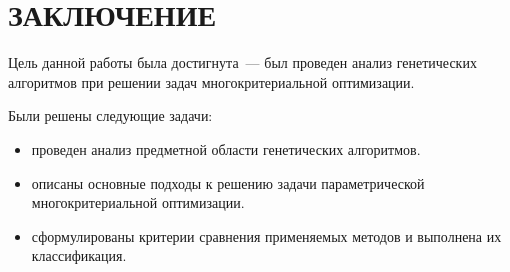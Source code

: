 \chapter*{ЗАКЛЮЧЕНИЕ}
Цель данной работы была достигнута~--- был проведен анализ генетических алгоритмов при решении задач многокритериальной оптимизации.

Были решены следующие задачи:
\begin{itemize}
    \item проведен анализ предметной области генетических алгоритмов.
    \item описаны основные подходы к решению задачи параметрической многокритериальной оптимизации.
    \item сформулированы критерии сравнения применяемых методов и выполнена их классификация.
\end{itemize}